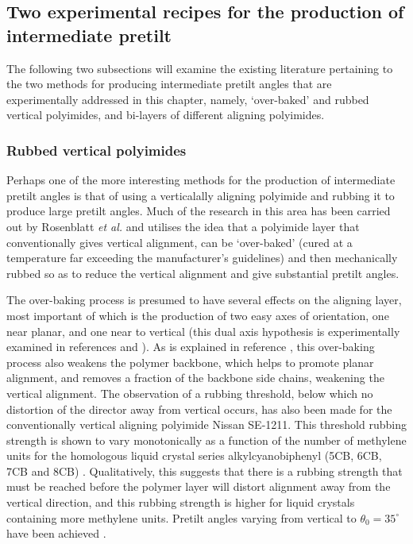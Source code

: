 \subsection{Two experimental recipes for the production of intermediate pretilt}
The following two subsections will examine the existing literature pertaining to the two methods for producing intermediate pretilt angles that are experimentally addressed in this chapter, namely, `over-baked' and rubbed vertical polyimides, and bi-layers of different aligning polyimides.

\subsubsection{Rubbed vertical polyimides}
\label{sec:over-baked}

Perhaps one of the more interesting methods for the production of intermediate pretilt angles is that of using a verticalally aligning polyimide and rubbing it to produce large pretilt angles. Much of the research in this area has been carried out by Rosenblatt \textit{et al.} \cite{Wang2007, Huang2005} and utilises the idea that a polyimide layer that conventionally gives vertical alignment, can be `over-baked' (cured at a temperature far exceeding the manufacturer's guidelines) and then mechanically rubbed so as to reduce the vertical alignment and give substantial pretilt angles.

The over-baking process is presumed to have several effects on the aligning layer, most important of which is the production of two easy axes of orientation, one near planar, and one near to vertical (this dual axis hypothesis is experimentally examined in references \cite{Shioda2003} and \cite{Syed2003}). As is explained in reference \cite{Huang2005}, this over-baking process also weakens the polymer backbone, which helps to promote planar alignment, and removes a fraction of the backbone side chains, weakening the vertical alignment. The observation of a rubbing threshold, below which no distortion of the director away from vertical occurs, has also been made for the conventionally vertical aligning polyimide Nissan SE-1211. This threshold rubbing strength is shown to vary monotonically as a function of the number of methylene units for the homologous liquid crystal series alkylcyanobiphenyl (5CB, 6CB, 7CB and 8CB) \cite{Huang2005}. Qualitatively, this suggests that there is a rubbing strength that must be reached before the polymer layer will distort alignment away from the vertical direction, and this rubbing strength is higher for liquid crystals containing more methylene units. Pretilt angles varying from vertical to $\theta_0=35^{\circ}$ have been achieved \cite{Huang2005}.


